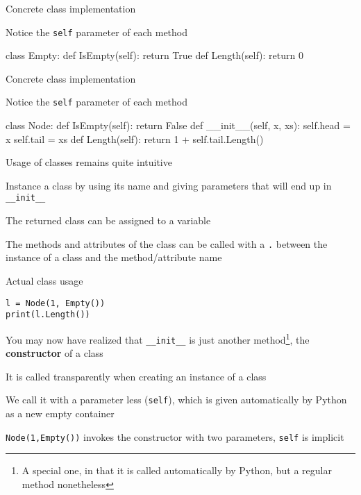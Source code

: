 \documentclass{beamer}
\begin{document}
\begin{frame}[fragile]{Concrete class implementation}
\begin{codewithblock}{\pause \item Notice the \texttt{self} parameter of each method}
class Empty:
  def IsEmpty(self): 
    return True
  def Length(self):
    return 0
\end{codewithblock}
\end{frame}

\begin{frame}[fragile]{Concrete class implementation}
\begin{codewithblock}{\pause \item Notice the \texttt{self} parameter of each method}
class Node:
  def IsEmpty(self): return False
  def __init__(self, x, xs):
    self.head = x
    self.tail = xs
  def Length(self):
    return 1 + self.tail.Length()
\end{codewithblock}
\end{frame}

\begin{slide}{
\item Usage of classes remains quite intuitive
\item Instance a class by using its name and giving parameters that will end up in \texttt{\_\_init\_\_}
\item The returned class can be assigned to a variable
\item The methods and attributes of the class can be called with a \texttt{.} between the instance of a class and the method/attribute name
}\end{slide}

\begin{frame}[fragile]{Actual class usage}
\begin{lstlisting}
l = Node(1, Empty())
print(l.Length())
\end{lstlisting}
\end{frame}

\begin{slide}{
\item You may now have realized that \texttt{\_\_init\_\_} is just another method\footnote{A special one, in that it is called automatically by Python, but a regular method nonetheless}, the \textbf{constructor} of a class
\item It is called transparently when creating an instance of a class
\item We call it with a parameter less (\texttt{self}), which is given automatically by Python as a new empty container
\item \texttt{Node(1,Empty())} invokes the constructor with two parameters, \texttt{self} is implicit
}\end{slide}
\end{document}
